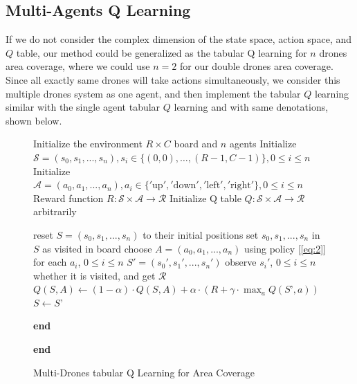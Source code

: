 \documentclass{article}
\begin{document}
\subsection{Multi-Agents Q Learning}

\hspace{\parindent} If we do not consider the complex dimension of the state space, action space, and $Q$ table, our method could be generalized as the tabular Q learning for $n$ drones area coverage, where we could use $n=2$ for our double drones area coverage. Since all exactly same drones will take actions simultaneously, we consider this multiple drones system as one agent, and then implement the tabular $Q$ learning similar with the single agent tabular $Q$ learning and with same denotations, shown below\cite{mul_q}. 

\begin{figure}[H]
  \centering
  \begin{minipage}{.7\linewidth}
  
    \begin{algorithm}[H]
    \caption{Multi-Drones tabular Q Learning for Area Coverage} 
    
        \begin{algorithmic}[1]
        \State Initialize the environment $R\times C$ board and $n$ agents
        \State Initialize $\mathcal{S}=(s_0,s_1,...,s_n), s_i \in \{(0,0),\dots, (R-1, C-1)\}, 0\leq i \leq n$
        \State Initialize $\mathcal{A} = (a_0,a_1,...,a_n), a_i\in\{'\text{up}', '\text{down}', '\text{left}', '\text{right}'\}, 0\leq i \leq n$
        \State Reward function $R: \mathcal{S} \times \mathcal{A} \rightarrow \mathcal{R}$
        \State Initialize Q table $Q: \mathcal{S} \times \mathcal{A} \rightarrow \mathcal{R}$ arbitrarily 
        
            \State reset $S=(s_0, s_1,...,s_n)$ to their initial positions
                \State set $s_0, s_1,...,s_n$ in $S$ as visited in board 
                \State choose $A=(a_0, a_1,...,a_n)$ using policy [\ref{eq:2}] for each $a_i$, $0\leq i \leq n$
                \State $S' = (s_0', s_1',...,s_n')$
                \State observe $s_i'$, $0\leq i \leq n$ whether it is visited, and get $
                \mathcal{R}$
                \State $Q(S, A) \gets (1-\alpha) \cdot Q(S, A) + \alpha \cdot (R + \gamma \cdot \max_{a} Q(S’, a))$
                \State $S \gets S’$
            \EndWhile
                
        \State \textbf{end}
            \EndWhile
    
        \State \textbf{end}
                
        \end{algorithmic}
    \end{algorithm}

  \end{minipage}
\end{figure}
\end{document}
